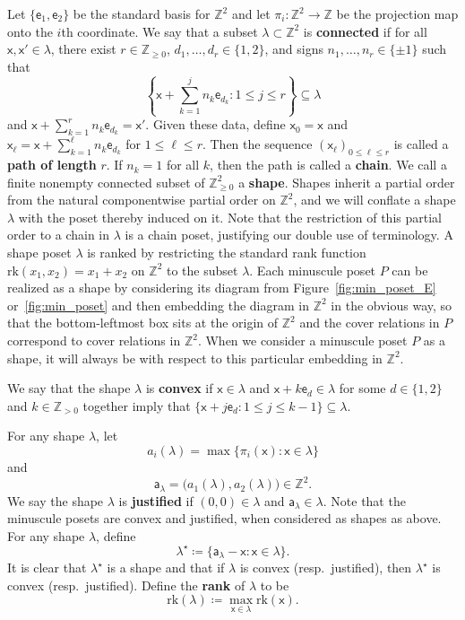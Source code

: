 \documentclass[12pt]{amsart}
\newcommand{\x}{\ensuremath{\mathsf{x}}}
\newcommand{\e}{\ensuremath{\mathsf{e}}}
\newcommand{\aaa}{\ensuremath{\mathsf{a}}}
\theoremstyle{definition}
\theoremstyle{remark}
\numberwithin{equation}{section}
\newcommand{\rank}{\ensuremath{\mathrm{rk}}}
\begin{document}
Let $\{ \e_1, \e_2 \}$ be the standard basis for $\mathbb{Z}^{2}$ and let $\pi_i : \mathbb{Z}^{2} \to \mathbb{Z}$ be the projection map onto the $i$th coordinate. We say that a subset $\lambda \subset \mathbb{Z}^{2}$ is {\bf connected} if for all $\x,\x' \in \lambda$, there exist $r \in \mathbb{Z}_{\geq 0}$, $d_1, \ldots, d_r \in \{1, 2 \}$, and signs $n_1, \ldots, n_r \in \{ \pm 1 \}$ such that 
\[\left\{ \x + \sum_{k=1}^j n_k \e_{d_k} :  1\leq j \leq r \right\} \subseteq \lambda\]
 and $\x + \sum_{k=1}^r n_k \e_{d_k} = \x'$. Given these data, define $\x_0 = \x$ and $\x_\ell = \x + \sum_{k=1}^\ell n_k \e_{d_k}$ for $1 \leq \ell \leq r$. Then the sequence $\left( \x_\ell  \right)_{0 \leq \ell \leq r}$ is called a {\bf path of length} $r$. If $n_k = 1$ for all $k$, then the path is called a {\bf chain}. We call a finite nonempty connected subset of $\mathbb{Z}_{\geq 0}^2$ a {\bf shape}.  Shapes inherit a partial order from the natural componentwise partial order on $\mathbb{Z}^2$, and we will conflate a shape $\lambda$ with the poset thereby induced on it. Note that the restriction of this partial order to a chain in $\lambda$ is a chain poset, justifying our double use of terminology. A shape poset $\lambda$ is ranked by restricting the standard rank function $\text{rk}(x_1,x_2) = x_1 + x_2$ on $\mathbb{Z}^2$ to the subset $\lambda$. Each minuscule poset $P$ can be realized as a shape by considering its diagram from Figure~\ref{fig:min_poset_E} or~\ref{fig:min_poset} and then embedding the diagram in $\mathbb{Z}^2$ in the obvious way, so that the bottom-leftmost box sits at the origin of $\mathbb{Z}^2$ and the cover relations in $P$ correspond to cover relations in $\mathbb{Z}^2$. When we consider a minuscule poset $P$ as a shape, it will always be with respect to this particular embedding in $\mathbb{Z}^2$.

We say that the shape $\lambda$ is {\bf convex} if $\x\in \lambda$ and $\x + k  \e_d \in \lambda $ for some $d \in \{1, 2\}$ and $k \in \mathbb{Z}_{> 0}$ together imply  that $\{\x + j \e_d : 1 \leq j \leq k-1 \} \subseteq \lambda.$

For any shape $\lambda$, let \[a_i(\lambda) = \max \{ \pi_i(\x) \colon \x \in \lambda\}\] and \[\aaa_\lambda = \big(a_1(\lambda),a_{2}(\lambda)\big) \in \mathbb{Z}^2.\] We say the shape $\lambda$ is {\bf justified} if $(0,0) \in \lambda$ and $\aaa_{\lambda} \in \lambda$. Note that the minuscule posets are convex and justified, when considered as shapes as above. For any shape $\lambda$, define 
\[
\lambda^\star \coloneqq \lbrace \aaa_\lambda - \x: \x \in \lambda \rbrace.
\] It is clear that $\lambda^{\star}$ is a shape and that if $\lambda$ is convex (resp.\ justified), then $\lambda^\star$ is convex (resp.\ justified).  Define the {\bf rank} of $\lambda$ to be
\[ 
\rank(\lambda) \coloneqq \max_{\x \in \lambda} \rank(\x).
\]
\end{document}
